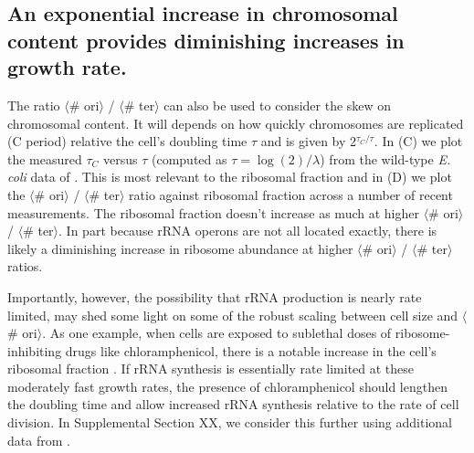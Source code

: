 \subsection{An exponential increase in chromosomal content provides diminishing
increases in growth rate.}

The ratio $\langle$\# ori$\rangle$ / $\langle$\# ter$\rangle$ can also be used
to consider the skew on chromosomal content. It will depends on how quickly
chromosomes are replicated (C period) relative the cell's doubling time $\tau$
and is given by 2$^{\tau_C / \tau}$. In (C) we plot
the measured $\tau_C$ versus $\tau$ (computed as $\tau = \log (2) / \lambda$)
from the wild-type \textit{E. coli} data of \citep{si2017}.  This is most
relevant to the ribosomal  fraction and in (D) we
plot the $\langle$\# ori$\rangle$ / $\langle$\# ter$\rangle$ ratio against
ribosomal fraction across a number of recent measurements.
The ribosomal fraction doesn't increase as much at higher $\langle$\# ori$\rangle$ /
$\langle$\# ter$\rangle$. In part because rRNA operons are not all located
exactly,  there is likely a diminishing increase in ribosome abundance at higher
$\langle$\# ori$\rangle$ / $\langle$\# ter$\rangle$ ratios.

Importantly, however, the possibility that rRNA production is nearly rate limited, may
shed some light on some of the robust scaling between cell size  and
$\langle$\# ori$\rangle$. As one example, when cells are exposed to sublethal
doses of ribosome-inhibiting drugs like chloramphenicol, there is a notable
increase in the cell's ribosomal fraction \citep{scott2010, dai2016}. If rRNA
synthesis is essentially rate limited at these moderately  fast growth rates,
the presence of chloramphenicol should lengthen the doubling time and allow
increased rRNA synthesis relative to the rate of cell division. In Supplemental
Section XX, we consider this further using additional data from \cite{si2017}.


